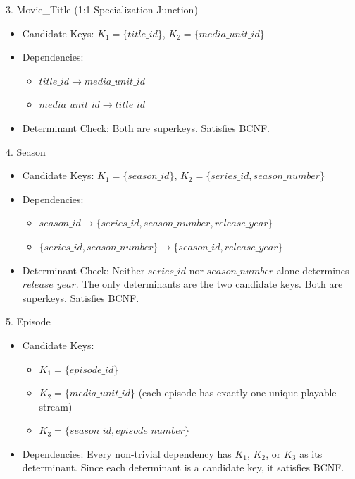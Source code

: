 3. Movie\_\allowbreak{}Title (1:1 Specialization Junction)

\begin{itemize}
\item
  Candidate Keys: \(K_{1} = \{ title\_\allowbreak{} id\}\), \(K_{2} = \{ media\_\allowbreak{} unit\_\allowbreak{} id\}\)
\item
  Dependencies:

  \begin{itemize}
  \item
    \(title\_\allowbreak{} id \rightarrow media\_\allowbreak{} unit\_\allowbreak{} id\)
  \item
    \(media\_\allowbreak{} unit\_\allowbreak{} id \rightarrow title\_\allowbreak{} id\)
  \end{itemize}
\item
  Determinant Check: Both are superkeys. Satisfies BCNF.
\end{itemize}

4. Season

\begin{itemize}
\item
  Candidate Keys: \(K_{1} = \{ season\_\allowbreak{} id\}\), \(K_{2} = \{ series\_\allowbreak{} id,season\_\allowbreak{} number\}\)
\item
  Dependencies:

  \begin{itemize}
  \item
    \(season\_\allowbreak{} id \rightarrow \{ series\_\allowbreak{} id,season\_\allowbreak{} number,release\_\allowbreak{} year\}\)
  \item
    \(\{ series\_\allowbreak{} id,season\_\allowbreak{} number\} \rightarrow \{ season\_\allowbreak{} id,release\_\allowbreak{} year\}\)
  \end{itemize}
\item
  Determinant Check: Neither \(series\_\allowbreak{} id\) nor \(season\_\allowbreak{} number\) alone determines \(release\_\allowbreak{} year\). The only determinants are the two candidate keys. Both are superkeys. Satisfies BCNF.
\end{itemize}

5. Episode

\begin{itemize}
\item
  Candidate Keys:

  \begin{itemize}
  \item
    \(K_{1} = \{ episode\_\allowbreak{} id\}\)
  \item
    \(K_{2} = \{ media\_\allowbreak{} unit\_\allowbreak{} id\}\) (each episode has exactly one unique playable stream)
  \item
    \(K_{3} = \{ season\_\allowbreak{} id,episode\_\allowbreak{} number\}\)
  \end{itemize}
\item
  Dependencies: Every non-trivial dependency has \(K_{1}\), \(K_{2}\), or \(K_{3}\) as its determinant. Since each determinant is a candidate key, it satisfies BCNF.
\end{itemize}

